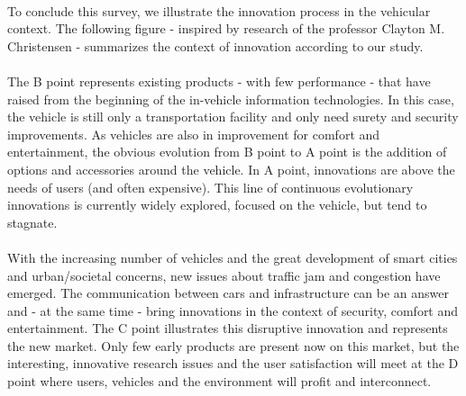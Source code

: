 \documentclass[a4paper]{article}
\begin{document}
\paragraph{}To conclude this survey, we illustrate the innovation process in the vehicular context. The following figure - inspired by research of the professor Clayton M. Christensen \cite{Christensen1997} - summarizes the context of innovation according to our study. 

\paragraph{}The B point represents existing products - with few performance - that have raised from the beginning of the in-vehicle information technologies. In this case, the vehicle is still only a transportation facility and only need surety and security improvements. As vehicles are also in improvement for comfort and entertainment, the obvious evolution from B point to A point is the addition of options and accessories around the vehicle. In A point, innovations are above the needs of users (and often expensive). This line of continuous evolutionary innovations is currently widely explored, focused on the vehicle, but tend to stagnate. 

\paragraph{}With the increasing number of vehicles and the great development of smart cities and urban/societal concerns, new issues about traffic jam and congestion have emerged. The communication between cars and infrastructure can be an answer and - at the same time - bring innovations in the context of security, comfort and entertainment. The C point illustrates this disruptive innovation and represents the new market. Only few early products are present now on this market, but the interesting, innovative research issues and the user satisfaction will meet at the D point where users, vehicles and the environment will profit and interconnect.
 
\appendix




\end{document}
